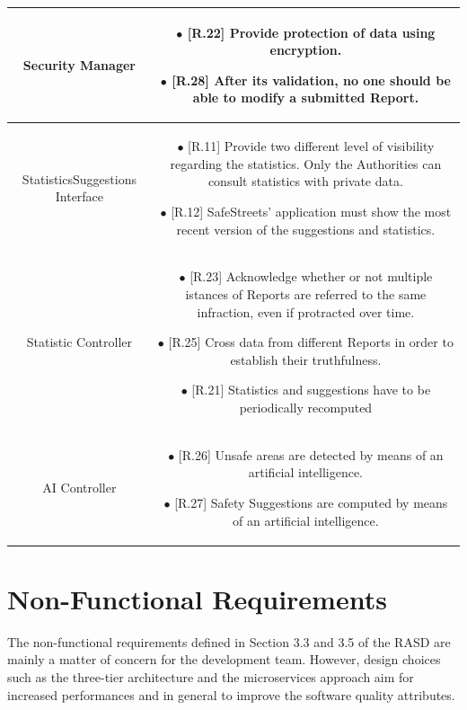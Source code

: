 \documentclass{report}
\begin{document}
\begin{tabularx}{\linewidth}{| c || c |}
	\hline
    \large{Security Manager} & \parbox{0.45\textwidth}{ \vspace{2mm}
    $\bullet$ {[R.22]} Provide protection of data using encryption.\\

	$\bullet$ {[R.28]} After its validation, no one should be able to modify a submitted Report.\\}\\


	\hline
    \large{StatisticsSuggestions Interface} & \parbox{0.45\textwidth}{ \vspace{2mm} 
    $\bullet$ {[R.11]} Provide two different level of visibility regarding the statistics. Only the Authorities can consult statistics with private data. \\

    $\bullet$ {[R.12]} SafeStreets' application must show the most recent version of the suggestions and statistics.\\}\\
    
	\hline
    \large{Statistic Controller} & \parbox{0.45\textwidth}{ \vspace{2mm}
    $\bullet$ {[R.23]} Acknowledge whether or not multiple istances of Reports are referred to the same infraction, even if protracted over time.\\

    $\bullet$ {[R.25]} Cross data from different Reports in order to establish their truthfulness.\\

    $\bullet$ {[R.21]} Statistics and suggestions have to be periodically recomputed\\}\\

	\hline
    \large{AI Controller} & \parbox{0.45\textwidth}{ \vspace{2mm}
    $\bullet$ {[R.26]} Unsafe areas are detected by means of an artificial intelligence.\\

	$\bullet$ {[R.27]} Safety Suggestions are computed by means of an artificial intelligence.\\}\\
    \hline
    
\end{tabularx}

\section{Non-Functional Requirements}
The non-functional requirements defined in Section 3.3 and 3.5 of the RASD are mainly a matter of concern for the development team. However, design choices such as the three-tier architecture and the microservices approach aim for increased performances and in general to improve the software quality attributes.
\end{document}
